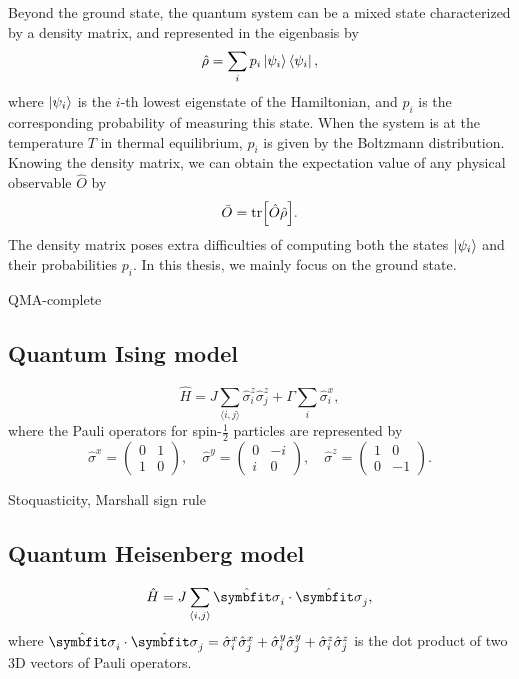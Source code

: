 Beyond the ground state, the quantum system can be a mixed state characterized by a density matrix, and represented in the eigenbasis by
\begin{equation}
\hat{\rho} = \sum_i p_i \ket{\psi_i}\bra{\psi_i},
\end{equation}
where $\ket{\psi_i}$ is the $i$-th lowest eigenstate of the Hamiltonian, and $p_i$ is the corresponding probability of measuring this state. When the system is at the temperature $T$ in thermal equilibrium, $p_i$ is given by the Boltzmann distribution. Knowing the density matrix, we can obtain the expectation value of any physical observable $\hat{O}$ by
\begin{equation}
\bar{O} = \tr[\hat{O} \hat{\rho}].
\label{eq:dm-obs}
\end{equation}
The density matrix poses extra difficulties of computing both the states $\ket{\psi_i}$ and their probabilities $p_i$. In this thesis, we mainly focus on the ground state.

QMA-complete~\cite{kempe2006complexity, oliveira2008complexity}

\subsection{Quantum Ising model}

\begin{equation}
\hat{H} = J \sum_{\langle i, j \rangle} \hat{\sigma}^z_i \hat{\sigma}^z_j + \Gamma \sum_i \hat{\sigma}^x_i,
\label{eq:qu-ising}
\end{equation}
where the Pauli operators for spin-$\frac{1}{2}$ particles are represented by
\begin{equation}
\hat{\sigma}^x = \begin{pmatrix} 0 & 1 \\ 1 & 0 \end{pmatrix}, \quad
\hat{\sigma}^y = \begin{pmatrix} 0 & -i \\ i & 0 \end{pmatrix}, \quad
\hat{\sigma}^z = \begin{pmatrix} 1 & 0 \\ 0 & -1 \end{pmatrix}.
\end{equation}

Stoquasticity, Marshall sign rule

\subsection{Quantum Heisenberg model}

\begin{equation}
\hat{H} = J \sum_{\langle i, j \rangle} \hat{\vsi}_i \cdot \hat{\vsi}_j,
\end{equation}
where $\hat{\vsi}_i \cdot \hat{\vsi}_j = \hat{\sigma}^x_i \hat{\sigma}^x_j + \hat{\sigma}^y_i \hat{\sigma}^y_j + \hat{\sigma}^z_i \hat{\sigma}^z_j$ is the dot product of two 3D vectors of Pauli operators.
